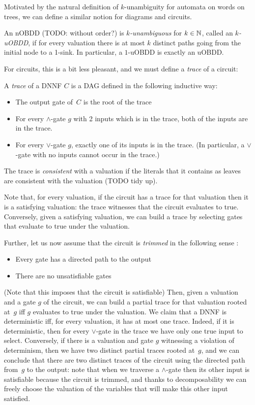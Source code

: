 Motivated by the natural definition of $k$-unambiguity for automata on words on
trees, we can define a similar notion for diagrams and circuits.

\begin{definition}
  An nOBDD (TODO: without order?) is \emph{$k$-unambiguous} for $k\in\mathbb{N}$,
  called an \emph{$k$-uOBDD}, if for every valuation there is at most $k$
  distinct paths going from the initial node to a 1-sink. In particular, a
  $1$-uOBDD is exactly an uOBDD.
\end{definition}

For circuits, this is a bit less pleasant, and we must define a \emph{trace} of
a circuit:

\begin{definition}
  A \emph{trace} of a DNNF $C$ is a DAG defined in the following inductive way:
  \begin{itemize}
    \item The output gate of~$C$ is the root of the trace
    \item For every $\land$-gate $g$ with 2 inputs which is in the trace, both
      of the inputs are in the trace.
    \item For every $\lor$-gate $g$, exactly one of its inputs is in the trace.
      (In particular, a $\lor$-gate with no inputs cannot occur in the trace.)
  \end{itemize}
  The trace is \emph{consistent} with a valuation if the literals that it
  contains as leaves are consistent with the valuation (TODO tidy up).
\end{definition}

Note that, for every valuation, if the circuit has a trace for that valuation
then it is a satisfying valuation: the trace witnesses that the circuit
evaluates to true. Conversely, given a satisfying valuation, we can
build a trace by selecting gates that evaluate to true under the
valuation.

Further, let us now assume that the circuit is \emph{trimmed} in the following
sense :
\begin{itemize}
  \item Every gate has a directed path to the output
  \item There are no unsatisfiable gates
\end{itemize}
(Note that this imposes that the circuit is satisfiable)
Then, given a valuation and a gate $g$ of the circuit, we
can build a partial trace for that valuation rooted at~$g$ iff $g$ evaluates to
true under the valuation.
We claim that a DNNF is deterministic iff, for every valuation, it has at most
one trace. Indeed, if it is deterministic, then for every $\lor$-gate in the
trace we have only one true input to select. Conversely, if there is a valuation
and gate $g$ witnessing a violation of determinism, then we have two distinct
partial traces rooted at~$g$, and we can conclude that there are two distinct
traces of the circuit using the directed path from~$g$ to the output: note that
when we traverse a $\land$-gate then its other input is satisfiable because the
circuit is trimmed, and thanks to decomposability we can freely choose the
valuation of the variables that will make this other input satisfied.

